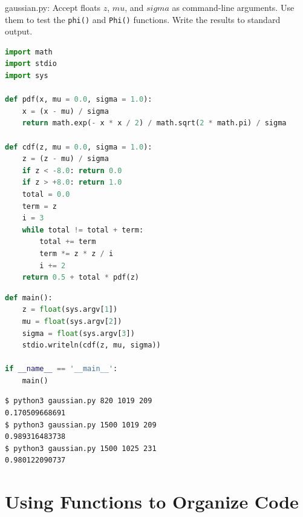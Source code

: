 \documentclass[8pt,a4paper,compress]{beamer}
\begin{document}
\begin{frame}[fragile]
\pause

\begin{framed}
\tiny gaussian.py: Accept floats $z$, $mu$, and $sigma$ as command-line arguments. Use them to test the \lstinline{phi()} and \lstinline{Phi()} functions. Write the results to standard output.
\end{framed}

\begin{lstlisting}[language=Python]
import math
import stdio
import sys

def pdf(x, mu = 0.0, sigma = 1.0):
    x = (x - mu) / sigma
    return math.exp(- x * x / 2) / math.sqrt(2 * math.pi) / sigma

def cdf(z, mu = 0.0, sigma = 1.0):
    z = (z - mu) / sigma
    if z < -8.0: return 0.0
    if z > +8.0: return 1.0
    total = 0.0
    term = z
    i = 3
    while total != total + term:
        total += term
        term *= z * z / i
        i += 2
    return 0.5 + total * pdf(z)
\end{lstlisting}
\end{frame}

\begin{frame}[fragile]
\pause

\begin{lstlisting}[language=Python]
def main():
    z = float(sys.argv[1])
    mu = float(sys.argv[2])
    sigma = float(sys.argv[3])
    stdio.writeln(cdf(z, mu, sigma))

if __name__ == '__main__':
    main()
\end{lstlisting}

\pause

\begin{lstlisting}[language={}]
$ python3 gaussian.py 820 1019 209
0.170509668691
$ python3 gaussian.py 1500 1019 209
0.989316483738
$ python3 gaussian.py 1500 1025 231
0.980122090737
\end{lstlisting}
\end{frame}

\section{Using Functions to Organize Code}
\end{document}
